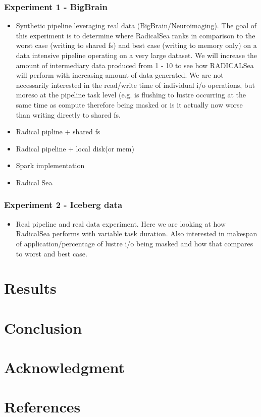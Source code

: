 \documentclass[conference]{IEEEtran}
\begin{document}
    \subsubsection{Experiment 1 - BigBrain}
    \begin{itemize}
            \item Synthetic pipeline leveraging real data (BigBrain/Neuroimaging). The goal of this experiment is to determine
            where RadicalSea ranks in comparison to the worst case (writing to shared fs) and best case (writing to memory only) on
            a data intensive pipeline operating on a very large dataset. 
            We will increase the amount of intermediary data produced from 1 - 10 to see how RADICALSea will perform with increasing amount of data generated.
            We are not necessarily interested in the read/write time of individual i/o operations, but moreso at the pipeline task level (e.g. is flushing to lustre occurring at
            the same time as compute therefore being masked or is it actually now worse than writing directly to shared fs.
            \item Radical pipline + shared fs
            \item Radical pipeline + local disk(or mem)
            \item Spark implementation
            \item Radical Sea
    \end{itemize}
    \subsubsection{Experiment 2 - Iceberg data}
    \begin{itemize}
        \item Real pipeline and real data experiment. Here we are looking at how RadicalSea performs with variable task duration. Also interested in makespan of application/percentage of lustre  i/o being masked and how that compares to worst and best case.
        \end{itemize}

\section{Results}
\section{Conclusion}

\section*{Acknowledgment}

\section*{References}
\end{document}
